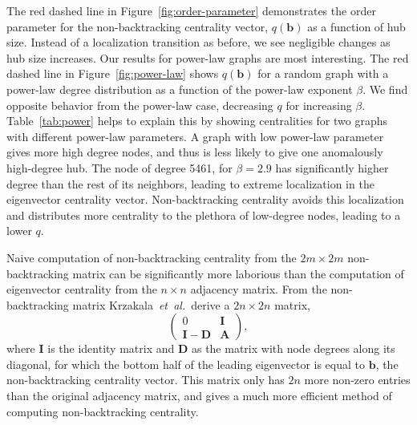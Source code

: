 \documentclass[twocolumn,prl,superscriptaddress]{revtex4}
\newcommand{\etal}{{\it{}et~al.}}
\newcommand{\mat}{\mathbf}
\renewcommand{\vec}{\mathbf}
\begin{document}
The red dashed line in Figure~\ref{fig:order-parameter} demonstrates the order parameter for the non-backtracking centrality vector, $q(\vec{b})$ as a function of hub size. Instead of a localization transition as before, we see negligible changes as hub size increases. Our results for power-law graphs are most interesting. The red dashed line in Figure~\ref{fig:power-law} shows $q(\vec{b})$ for a random graph with a power-law degree distribution as a function of the power-law exponent $\beta$. We find opposite behavior from the power-law case, decreasing $q$ for increasing $\beta$. Table~\ref{tab:power} helps to explain this by showing centralities for two graphs with different power-law parameters. A graph with low power-law parameter gives more high degree nodes, and thus is less likely to give one anomalously high-degree hub. The node of degree 5461, for $\beta = 2.9$ has significantly higher degree than the rest of its neighbors, leading to extreme localization in the eigenvector centrality vector. Non-backtracking centrality avoids this localization and distributes more centrality to the plethora of low-degree nodes, leading to a lower $q$.

Naive computation of non-backtracking centrality from the $2m \times 2m$ non-backtracking matrix can be significantly more laborious than the computation of eigenvector centrality from the $n \times n$ adjacency matrix. From the non-backtracking matrix Krzakala~\etal\ derive a $2n \times 2n$ matrix, 
\begin{equation}
\left(
 \begin{array}{c|c}
 0 & \mat{I} \\
  \hline
  \mat{I} - \mat{D} & \mat{A}
 \end{array} \right),
\end{equation}
where $\mat{I}$ is the identity matrix and $\mat{D}$ as the matrix with node degrees along its diagonal, for which the bottom half of the leading eigenvector is equal to $\vec{b}$, the non-backtracking centrality vector. This matrix only has $2n$ more non-zero entries than the original adjacency matrix, and gives a much more efficient method of computing non-backtracking centrality.
\end{document}
